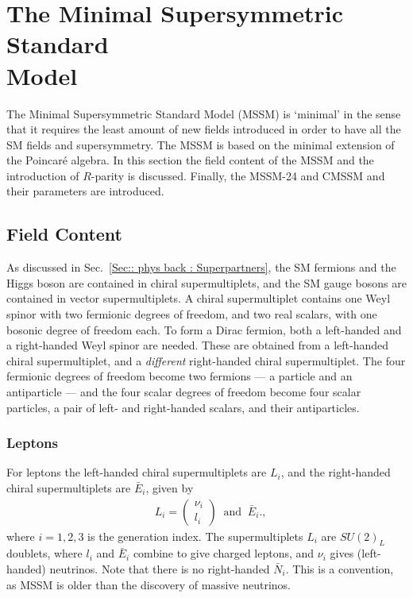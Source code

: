\documentclass[twoside,english]{uiofysmaster}
\begin{document}
\section{The Minimal Supersymmetric Standard\\ Model}

The Minimal Supersymmetric Standard Model (MSSM) is `minimal' in the sense that it requires the least amount of new fields introduced in order to have all the SM fields and supersymmetry. The MSSM is based on the minimal extension of the Poincar\'{e} algebra. In this section the field content of the MSSM and the introduction of $R$-parity is discussed. Finally, the MSSM-24 and CMSSM and their parameters are introduced.  


\subsection{Field Content}

As discussed in Sec.~\ref{Sec:: phys back : Superpartners}, the SM fermions and the Higgs boson are contained in chiral supermultiplets, and the SM gauge bosons are contained in vector supermultiplets. A chiral supermultiplet contains one Weyl spinor with two fermionic degrees of freedom, and two real scalars, with one bosonic degree of freedom each. To form a Dirac fermion, both a left-handed and a right-handed Weyl spinor are needed. These are obtained from a left-handed chiral supermultiplet, and a \textit{different} right-handed chiral supermultiplet. The four fermionic degrees of freedom become two fermions --- a particle and an antiparticle --- and the four scalar degrees of freedom become four scalar particles, a pair of left- and right-handed scalars, and their antiparticles.  

\subsubsection{Leptons}

For leptons the left-handed chiral supermultiplets are $L_i$, and the right-handed chiral supermultiplets are $\bar{E}_i$, given by 
\begin{align}
&L_i = \begin{pmatrix}
\nu_i\\
l_i
\end{pmatrix}
~\text{ and } ~
\bar{E}_i.,
\end{align}
where $i=1,2,3$ is the generation index. The supermultiplets $L_i$ are $SU(2)_L$ doublets, where $l_i$ and $\bar{E}_i$ combine to give charged leptons, and $\nu_i$ gives (left-handed) neutrinos. Note that there is no right-handed $\bar{N}_i$. This is a convention, as MSSM is older than the discovery of massive neutrinos. 
\end{document}
